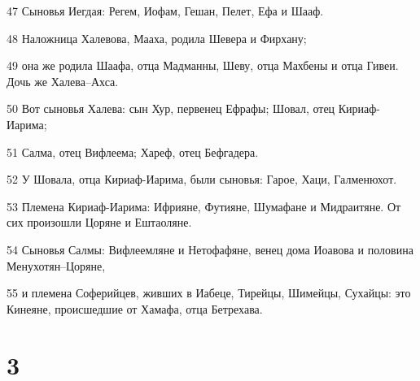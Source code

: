 \par 47 Сыновья Иегдая: Регем, Иофам, Гешан, Пелет, Ефа и Шааф.
\par 48 Наложница Халевова, Мааха, родила Шевера и Фирхану;
\par 49 она же родила Шаафа, отца Мадманны, Шеву, отца Махбены и отца Гивеи. Дочь же Халева--Ахса.
\par 50 Вот сыновья Халева: сын Хур, первенец Ефрафы; Шовал, отец Кириаф-Иарима;
\par 51 Салма, отец Вифлеема; Хареф, отец Бефгадера.
\par 52 У Шовала, отца Кириаф-Иарима, были сыновья: Гарое, Хаци, Галменюхот.
\par 53 Племена Кириаф-Иарима: Ифрияне, Футияне, Шумафане и Мидраитяне. От сих произошли Цоряне и Ештаоляне.
\par 54 Сыновья Салмы: Вифлеемляне и Нетофафяне, венец дома Иоавова и половина Менухотян--Цоряне,
\par 55 и племена Соферийцев, живших в Иабеце, Тирейцы, Шимейцы, Сухайцы: это Кинеяне, происшедшие от Хамафа, отца Бетрехава.

\chapter{3}

